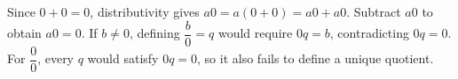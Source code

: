 Since $0+0=0$, distributivity gives $a0=a(0+0)=a0+a0$. Subtract $a0$ to obtain $a0=0$. If $b\ne0$, defining $\dfrac{b}{0}=q$ would require $0q=b$, contradicting $0q=0$. For $\dfrac{0}{0}$, every $q$ would satisfy $0q=0$, so it also fails to define a unique quotient.
